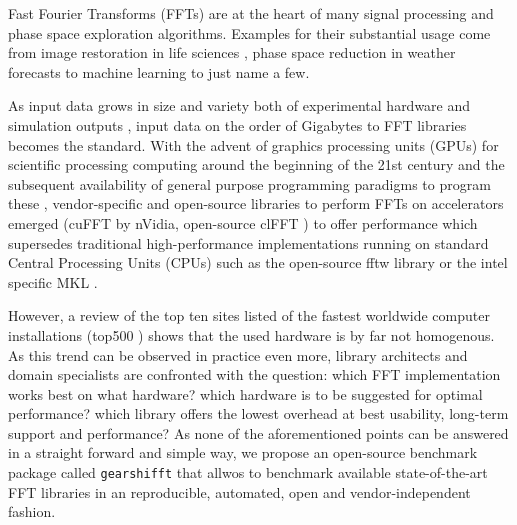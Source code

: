 Fast Fourier Transforms (FFTs) are at the heart of many signal processing and phase space exploration algorithms. Examples for their substantial usage come from image restoration in life sciences \cite{preibisch2014efficient,schmid2015real}, phase space reduction in weather forecasts \cite{maronga2015parallelized} to machine learning \cite{collobert2011torch7,jia2014caffe,abadi2016tensorflow} to just name a few.

As input data grows in size and variety both of experimental hardware \cite{huisken2004optical} and simulation outputs \cite{maronga2015parallelized}, input data on the order of Gigabytes to FFT libraries becomes the standard. With the advent of graphics processing units (GPUs) for scientific processing computing around the beginning of the 21st century and the subsequent availability of general purpose programming paradigms to program these \cite{du2012cuda}, vendor-specific and open-source libraries to perform FFTs on accelerators emerged (cuFFT \cite{nvidia2010cufft} by nVidia, open-source clFFT \cite{clfft}) to offer performance which supersedes traditional high-performance implementations running on standard Central Processing Units (CPUs) such as the open-source fftw library \cite{FFTW97,FFTW05} or the intel specific MKL \cite{intel2007intel}.

However, a review of the top ten sites listed of the fastest worldwide computer installations (top500 \cite{meuer2011top500}) shows that the used hardware is by far not homogenous. As this trend can be observed in practice even more, library architects and domain specialists are confronted with the question: which FFT implementation works best on what hardware? which hardware is to be suggested for optimal performance? which library offers the lowest overhead at best usability, long-term support and performance? As none of the aforementioned points can be answered in a straight forward and simple way, we propose an open-source benchmark package called \texttt{gearshifft} \cite{gearshifft_github} that allwos to benchmark available state-of-the-art FFT libraries in an reproducible, automated, open and vendor-independent fashion.



